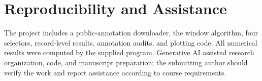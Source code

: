 \documentclass[10pt,journal,compsoc]{IEEEtran}
\begin{document}
\section*{Reproducibility and Assistance}
The project includes a public-annotation downloader, the window algorithm, four selectors, record-level results, annotation audits, and plotting code. All numerical results were computed by the supplied program. Generative AI assisted research organization, code, and manuscript preparation; the submitting author should verify the work and report assistance according to course requirements.


\end{document}
